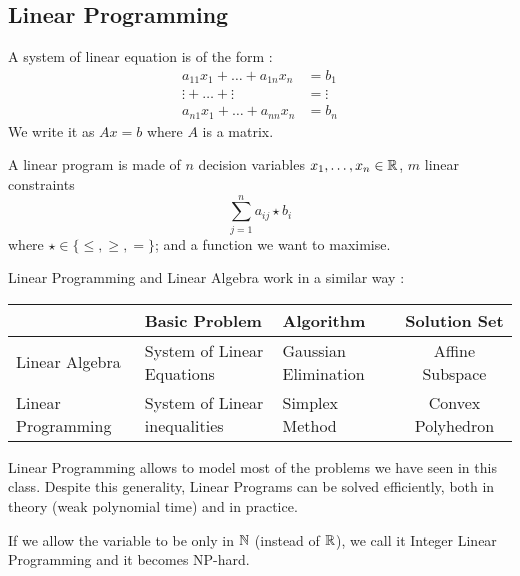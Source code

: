 \documentclass[12pt]{cours}
\begin{document}
\subsection{Linear Programming}
\begin{definition}
    A system of linear equation is of the form : 
    \[
        \begin{aligned}
            a_{11} x_{1} + \ldots + a_{1n} x_{n} &= b_{1}\\
            \vdots + \ldots + \vdots &= \vdots \\
            a_{n1}x_{1} + \ldots + a_{nn}x_{n} &= b_{n}
        \end{aligned}
    \]
    We write it as $Ax = b$ where $A$ is a matrix. 
\end{definition}
\begin{definition}
    A linear program is made of $n$ decision variables $x_{1}, \ldots, x_{n} \in \mathbb{R}$, $m$ linear constraints
    \[
        \sum_{j = 1}^{n} a_{ij} \star b_{i}
    \]
    where $\star \in \{\leq, \geq, =\}$; and a function we want to maximise. 
\end{definition}

\begin{proposition}
    Linear Programming and Linear Algebra work in a similar way : 
    \begin{center}
        \begin{tabular}{p{}p{}p{}c}
            & Basic Problem & Algorithm & Solution Set\\
            \midrule
            Linear \newline Algebra & System of \newline Linear Equations & Gaussian Elimination & Affine Subspace\\
            \midrule
            Linear \newline Programming & System of \newline Linear inequalities & Simplex Method & Convex Polyhedron
        \end{tabular}
    \end{center}
\end{proposition}

Linear Programming allows to model most of the problems we have seen in this class. Despite this generality, Linear Programs can be solved efficiently, both in theory (weak polynomial time) and in practice.
\begin{definition}
    If we allow the variable to be only in $\mathbb{N}$ (instead of $\mathbb{R}$), we call it Integer Linear Programming and it becomes NP-hard.
\end{definition}
\end{document}
